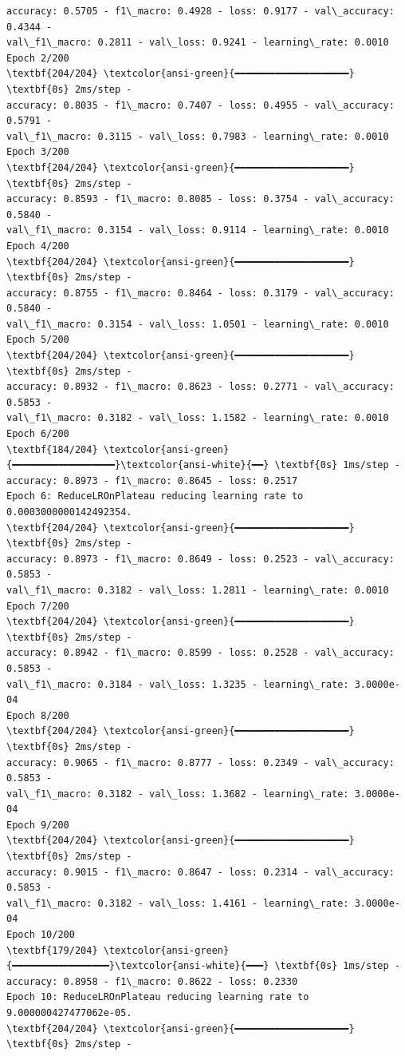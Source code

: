 \documentclass[11pt]{article}
\begin{document}
\begin{Verbatim}[commandchars=\\\{\}]
accuracy: 0.5705 - f1\_macro: 0.4928 - loss: 0.9177 - val\_accuracy: 0.4344 -
val\_f1\_macro: 0.2811 - val\_loss: 0.9241 - learning\_rate: 0.0010
Epoch 2/200
\textbf{204/204} \textcolor{ansi-green}{━━━━━━━━━━━━━━━━━━━━} \textbf{0s} 2ms/step -
accuracy: 0.8035 - f1\_macro: 0.7407 - loss: 0.4955 - val\_accuracy: 0.5791 -
val\_f1\_macro: 0.3115 - val\_loss: 0.7983 - learning\_rate: 0.0010
Epoch 3/200
\textbf{204/204} \textcolor{ansi-green}{━━━━━━━━━━━━━━━━━━━━} \textbf{0s} 2ms/step -
accuracy: 0.8593 - f1\_macro: 0.8085 - loss: 0.3754 - val\_accuracy: 0.5840 -
val\_f1\_macro: 0.3154 - val\_loss: 0.9114 - learning\_rate: 0.0010
Epoch 4/200
\textbf{204/204} \textcolor{ansi-green}{━━━━━━━━━━━━━━━━━━━━} \textbf{0s} 2ms/step -
accuracy: 0.8755 - f1\_macro: 0.8464 - loss: 0.3179 - val\_accuracy: 0.5840 -
val\_f1\_macro: 0.3154 - val\_loss: 1.0501 - learning\_rate: 0.0010
Epoch 5/200
\textbf{204/204} \textcolor{ansi-green}{━━━━━━━━━━━━━━━━━━━━} \textbf{0s} 2ms/step -
accuracy: 0.8932 - f1\_macro: 0.8623 - loss: 0.2771 - val\_accuracy: 0.5853 -
val\_f1\_macro: 0.3182 - val\_loss: 1.1582 - learning\_rate: 0.0010
Epoch 6/200
\textbf{184/204} \textcolor{ansi-green}{━━━━━━━━━━━━━━━━━━}\textcolor{ansi-white}{━━} \textbf{0s} 1ms/step -
accuracy: 0.8973 - f1\_macro: 0.8645 - loss: 0.2517
Epoch 6: ReduceLROnPlateau reducing learning rate to 0.0003000000142492354.
\textbf{204/204} \textcolor{ansi-green}{━━━━━━━━━━━━━━━━━━━━} \textbf{0s} 2ms/step -
accuracy: 0.8973 - f1\_macro: 0.8649 - loss: 0.2523 - val\_accuracy: 0.5853 -
val\_f1\_macro: 0.3182 - val\_loss: 1.2811 - learning\_rate: 0.0010
Epoch 7/200
\textbf{204/204} \textcolor{ansi-green}{━━━━━━━━━━━━━━━━━━━━} \textbf{0s} 2ms/step -
accuracy: 0.8942 - f1\_macro: 0.8599 - loss: 0.2528 - val\_accuracy: 0.5853 -
val\_f1\_macro: 0.3184 - val\_loss: 1.3235 - learning\_rate: 3.0000e-04
Epoch 8/200
\textbf{204/204} \textcolor{ansi-green}{━━━━━━━━━━━━━━━━━━━━} \textbf{0s} 2ms/step -
accuracy: 0.9065 - f1\_macro: 0.8777 - loss: 0.2349 - val\_accuracy: 0.5853 -
val\_f1\_macro: 0.3182 - val\_loss: 1.3682 - learning\_rate: 3.0000e-04
Epoch 9/200
\textbf{204/204} \textcolor{ansi-green}{━━━━━━━━━━━━━━━━━━━━} \textbf{0s} 2ms/step -
accuracy: 0.9015 - f1\_macro: 0.8647 - loss: 0.2314 - val\_accuracy: 0.5853 -
val\_f1\_macro: 0.3182 - val\_loss: 1.4161 - learning\_rate: 3.0000e-04
Epoch 10/200
\textbf{179/204} \textcolor{ansi-green}{━━━━━━━━━━━━━━━━━}\textcolor{ansi-white}{━━━} \textbf{0s} 1ms/step -
accuracy: 0.8958 - f1\_macro: 0.8622 - loss: 0.2330
Epoch 10: ReduceLROnPlateau reducing learning rate to 9.000000427477062e-05.
\textbf{204/204} \textcolor{ansi-green}{━━━━━━━━━━━━━━━━━━━━} \textbf{0s} 2ms/step -

\end{Verbatim}
\end{document}
